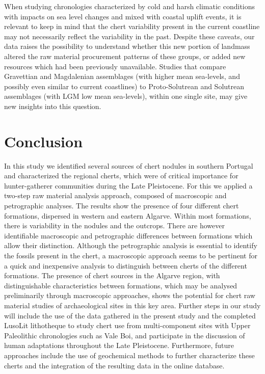 \documentclass[
  a4paper,
  DIV=11,
  numbers=noendperiod]{scrreprt}
\begin{document}
When studying chronologies characterized by cold and harsh climatic
conditions with impacts on sea level changes and mixed with coastal
uplift events, it is relevant to keep in mind that the chert variability
present in the current coastline may not necessarily reflect the
variability in the past. Despite these caveats, our data raises the
possibility to understand whether this new portion of landmass altered
the raw material procurement patterns of these groups, or added new
resources which had been previously unavailable. Studies that compare
Gravettian and Magdalenian assemblages (with higher mean sea-levels, and
possibly even similar to current coastlines) to Proto-Solutrean and
Solutrean assemblages (with LGM low mean sea-levels), within one single
site, may give new insights into this question.

\section*{Conclusion}\label{conclusion}


In this study we identified several sources of chert nodules in southern
Portugal and characterized the regional cherts, which were of critical
importance for hunter-gatherer communities during the Late Pleistocene.
For this we applied a two-step raw material analysis approach, composed
of macroscopic and petrographic analyses. The results show the presence
of four different chert formations, dispersed in western and eastern
Algarve. Within most formations, there is variability in the nodules and
the outcrops. There are however identifiable macroscopic and
petrographic differences between formations which allow their
distinction. Although the petrographic analysis is essential to identify
the fossils present in the chert, a macroscopic approach seems to be
pertinent for a quick and inexpensive analysis to distinguish between
cherts of the different formations. The presence of chert sources in the
Algarve region, with distinguishable characteristics between formations,
which may be analysed preliminarily through macroscopic approaches,
shows the potential for chert raw material studies of archaeological
sites in this key area. Further steps in our study will include the use
of the data gathered in the present study and the completed LusoLit
lithotheque to study chert use from multi-component sites with Upper
Paleolithic chronologies such as Vale Boi, and participate in the
discussion of human adaptations throughout the Late Pleistocene.
Furthermore, future approaches include the use of geochemical methods to
further characterize these cherts and the integration of the resulting
data in the online database.
\end{document}
